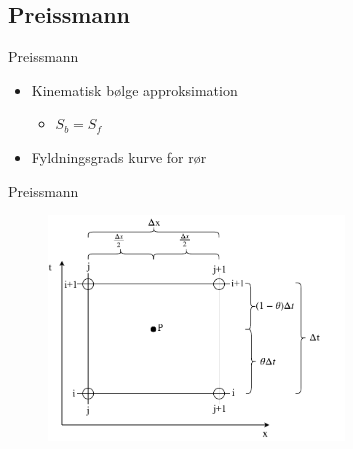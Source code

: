 \subsection{Preissmann}

\begin{frame}{Preissmann}{}
\vfill\vfill\centering
\begin{itemize}
	\vspace{2mm}
	\item Kinematisk bølge approksimation
	\begin{itemize}
		\item $S_b = S_f$
	\end{itemize}
	\vspace{3mm}
	\item Fyldningsgrads kurve for rør
\end{itemize}
\vfill\vfill		
\end{frame}

\begin{frame}{Preissmann}{}
\vfill\vfill\centering
		\begin{figure}[H]
			\centering
			\includegraphics[width=0.7\textwidth]{Sections/pictures/preissmann_scheme.pdf}
		\end{figure}
\vfill\vfill		
\end{frame}


